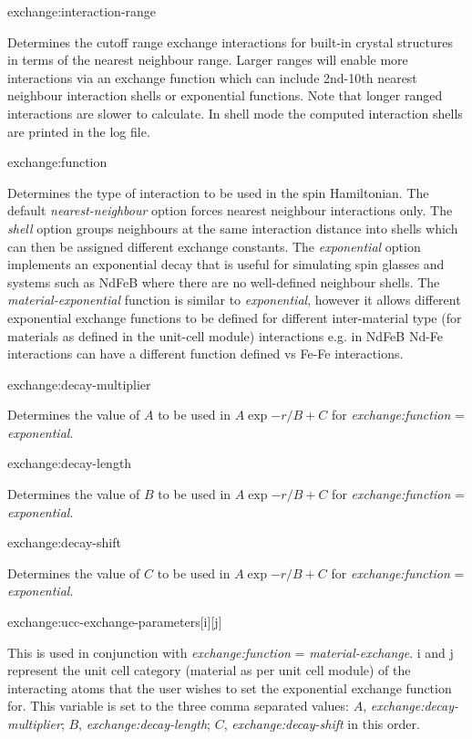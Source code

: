 {\zicf exchange:interaction-range}
Determines the cutoff range exchange interactions for built-in crystal structures
in terms of the nearest neighbour range. Larger ranges will enable more interactions
via an exchange function which can include 2nd-10th nearest neighbour interaction
shells or exponential functions. Note that longer ranged interactions are slower
to calculate. In shell mode the computed interaction shells are printed in the
log file.

{\zicf exchange:function}
Determines the type of interaction to be used in the spin Hamiltonian. The
default \textit{nearest-neighbour} option forces nearest neighbour interactions
only. The \textit{shell} option groups neighbours at the same interaction
distance into shells which can then be assigned different exchange constants.
The \textit{exponential} option implements an exponential decay that is useful
for simulating spin glasses and systems such as NdFeB where there are no
well-defined neighbour shells. The \textit{material-exponential} function is
similar to \textit{exponential}, however it allows different exponential
exchange functions to be defined for different inter-material type (for
materials as defined in the unit-cell module) interactions e.g. in NdFeB
Nd-Fe interactions can have a different function defined vs Fe-Fe interactions.

{\zicf exchange:decay-multiplier}
Determines the value of $A$ to be used in $A\exp{-r/B}+C$ for
\textit{exchange:function} = \textit{exponential}.

{\zicf exchange:decay-length}
Determines the value of $B$ to be used in $A\exp{-r/B}+C$ for
\textit{exchange:function} = \textit{exponential}.

{\zicf exchange:decay-shift}
Determines the value of $C$ to be used in $A\exp{-r/B}+C$ for
\textit{exchange:function} = \textit{exponential}.

{\zicf exchange:ucc-exchange-parameters[i][j]}
This is used in conjunction with \textit{exchange:function} =
\textit{material-exchange}. i and j represent the unit cell category (material
as per unit cell module) of the interacting atoms that the user wishes to set
the exponential exchange function for. This variable is set to the three comma
separated values: $A$, \textit{exchange:decay-multiplier}; $B$,
\textit{exchange:decay-length}; $C$, \textit{exchange:decay-shift} in this order.

